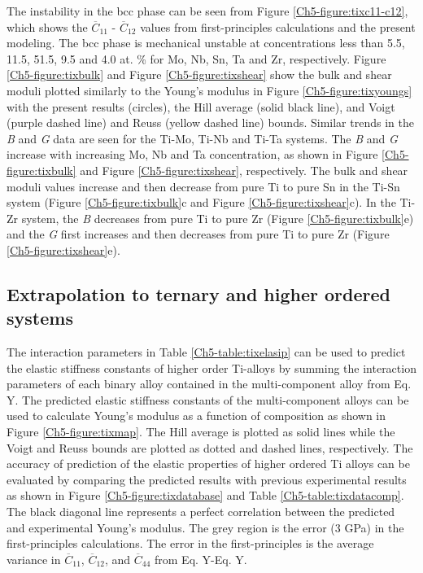 The instability in the bcc phase can be seen from Figure \ref{Ch5-figure:tixc11-c12}, which shows the $\overline{C}_{11}$ - $\overline{C}_{12}$ values from first-principles calculations and the present modeling. The bcc phase is mechanical unstable at concentrations less than 5.5, 11.5, 51.5, 9.5 and 4.0 at. \% for Mo, Nb, Sn, Ta and Zr, respectively. Figure \ref{Ch5-figure:tixbulk} and Figure \ref{Ch5-figure:tixshear} show the bulk and shear moduli plotted similarly to the Young's modulus in Figure \ref{Ch5-figure:tixyoungs} with the present results (circles), the Hill average (solid black line), and Voigt (purple dashed line) and Reuss (yellow dashed line) bounds. Similar trends in the \textit{B} and \textit{G} data are seen for the Ti-Mo, Ti-Nb and Ti-Ta systems. The \textit{B} and \textit{G} increase with increasing Mo, Nb and Ta concentration, as shown in Figure \ref{Ch5-figure:tixbulk} and Figure \ref{Ch5-figure:tixshear}, respectively.  The bulk and shear moduli values increase and then decrease from pure Ti to pure Sn in the Ti-Sn system (Figure \ref{Ch5-figure:tixbulk}c and Figure \ref{Ch5-figure:tixshear}c). In the Ti-Zr system, the \textit{B} decreases from pure Ti to pure Zr (Figure \ref{Ch5-figure:tixbulk}e) and the \textit{G} first increases and then decreases from pure Ti to pure Zr (Figure \ref{Ch5-figure:tixshear}e). 

\subsection{Extrapolation to ternary and higher ordered systems}

The interaction parameters in Table \ref{Ch5-table:tixelasip} can be used to predict the elastic stiffness constants of higher order Ti-alloys by summing the interaction parameters of each binary alloy contained in the multi-component alloy from Eq. Y. The predicted elastic stiffness constants of the multi-component alloys can be used to calculate Young's modulus as a function of composition as shown in Figure \ref{Ch5-figure:tixmap}. The Hill average is plotted as solid lines while the Voigt and Reuss bounds are plotted as dotted and dashed lines, respectively. The accuracy of prediction of the elastic properties of higher ordered Ti alloys can be evaluated by comparing the predicted results with previous experimental results \cite{Niinomi2012,Tane2010a,Geetha2009,Mohammed2014} as shown in Figure \ref{Ch5-figure:tixdatabase} and Table \ref{Ch5-table:tixdatacomp}. The black diagonal line represents a perfect correlation between the predicted and experimental Young's modulus. The grey region is the error (3 GPa) in the first-principles calculations. The error in the first-principles is the average variance in $\overline{C}_{11}$, $\overline{C}_{12}$, and $\overline{C}_{44}$ from Eq. Y-Eq. Y. 

